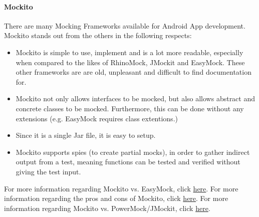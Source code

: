 \documentclass[11pt,a4paper,titlepage]{article}
\begin{document}
			\paragraph{Mockito}
		There are many Mocking Frameworks available for Android App development. 
		Mockito stands out from the others in the following respects:
			\begin{itemize}
				\item Mockito is simple to use, implement and is a lot more readable, especially when compared to the likes of RhinoMock, JMockit and EasyMock. These other frameworks are are old, unpleasant and difficult to find documentation for.
				\item Mockito not only allows interfaces to be mocked, but also allows abstract and concrete classes to be mocked. Furthermore, this can be done without any extensions (e.g. EasyMock requires class extentions.)
				\item Since it is a single Jar file, it is easy to setup. 
				\item Mockito supports spies (to create partial mocks), in order to gather indirect output from a test, meaning functions can be tested and verified without giving the test input. 
				\end{itemize}
				For more information regarding Mockito vs. EasyMock, click \href{https://code.google.com/p/mockito/wiki/MockitoVSEasyMock}{here}. \newline
				For more information regarding the pros and cons of Mockito, click \href{http://hamletdarcy.blogspot.com/2010/09/mockito-pros-cons-and-best-practices.html}{here}. \newline
				For more information regarding Mockito vs. PowerMock/JMockit, click \href{http://www.coderanch.com/t/524265/Testing/TestNG-JUnit-mockito-Powermock-jmockit}{here}. \newline
\end{document}
